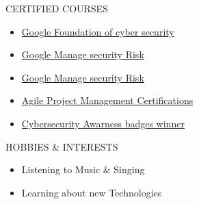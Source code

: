 \documentclass{resume}
\begin{document}
\vspace{-0.2em}
\begin{rSection}{CERTIFIED COURSES}
    \begin{itemize}
        \item \href{https://coursera.org/share/dc5df20e6dc55a6b8b97cd5bc2d5d927}{Google Foundation of cyber security}
        \item \href{https://coursera.org/share/f75c0a81532aebe121347db41be1d9e5}{Google Manage security Risk}
        \item \href{https://coursera.org/share/f75c0a81532aebe121347db41be1d9e5}{Google Manage security Risk}

        \item \href{https://coursera.org/share/ae0e32c17961f344ea9a2e872c30deae}{Agile Project Management Certifications}
        \item \href{https://app.kajabi.com/certificates/1d00b4fe}{Cybersecurity Awarness badges winner}
    \end{itemize}
    \vspace{-0.4em}
\end{rSection}

\begin{rSection}{HOBBIES \& INTERESTS}
    \begin{itemize}
        \item Listening to Music \& Singing
              \vspace{-0.4em}
        \item Learning about new Technologies
    \end{itemize}
\end{rSection}
\vspace{-0.4em}

\end{document}
